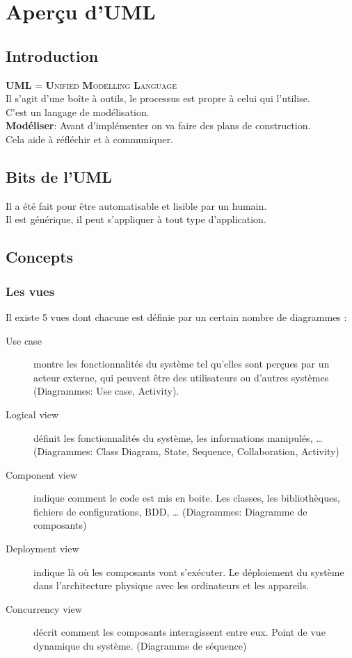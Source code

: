 \section{Aperçu d'UML}



\subsection{Introduction}
\textsc{\textbf{UML}} = \textsc{\textbf{U}nified \textbf{M}odelling \textbf{L}anguage}
\\Il s’agit d’une boîte à outils, le processus est propre à celui qui l’utilise.
\\C’est un langage de modélisation.
\\\textbf{Modéliser}: Avant d’implémenter on va faire des plans de construction.
\\Cela aide à réfléchir et à communiquer.



\subsection{Bits de l'UML}
Il a été fait pour être automatisable et lisible par un humain.
\\Il est générique, il peut s’appliquer à tout type d’application.



\subsection{Concepts}



\subsubsection{Les vues}
Il existe 5 vues dont chacune est définie par un certain nombre de diagrammes :
\begin{description}
	\item [Use case] montre les fonctionnalités du système tel qu’elles sont perçues par un acteur externe, qui peuvent être des utilisateurs ou d’autres systèmes (Diagrammes: Use case, Activity).
    
	\item [Logical view] définit les fonctionnalités du système, les informations manipulés, … (Diagrammes: Class Diagram, State, Sequence, Collaboration, Activity)

	\item [Component view] indique comment le code est mis en boite. Les classes, les bibliothèques, fichiers de configurations, BDD, … (Diagrammes: Diagramme de composants)

	\item [Deployment view] indique là où les composants vont s’exécuter.  Le déploiement du système dans l’architecture physique avec les ordinateurs et les appareils.

	\item [Concurrency view] décrit comment les composants interagissent entre eux. Point de vue dynamique du système. (Diagramme de séquence)
\end{description}



